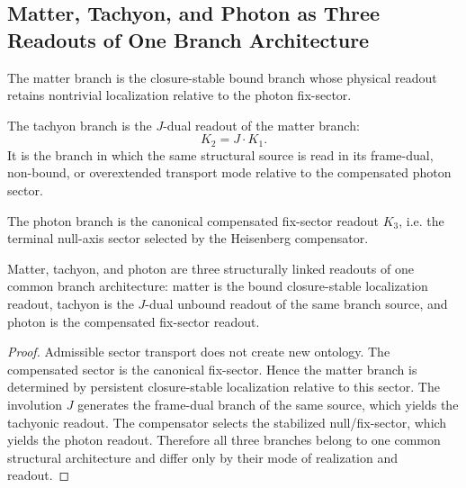 \subsection{Matter, Tachyon, and Photon as Three Readouts of One Branch Architecture}
\label{subsec:mtp-readout}

\begin{definition}
The matter branch is the closure-stable bound branch whose physical readout
retains nontrivial localization relative to the photon fix-sector.
\end{definition}

\begin{definition}
The tachyon branch is the $J$-dual readout of the matter branch:
\[
K_2 = J\!\cdot\!K_1.
\]
It is the branch in which the same structural source is read in its frame-dual,
non-bound, or overextended transport mode relative to the compensated photon
sector.
\end{definition}

\begin{definition}
The photon branch is the canonical compensated fix-sector readout $K_3$, i.e. the terminal null-axis sector selected by the Heisenberg compensator.
\end{definition}

\begin{theorem}
\label{thm:three-readout-principle}
Matter, tachyon, and photon are three structurally linked readouts of one
common branch architecture: matter is the bound closure-stable localization
readout, tachyon is the $J$-dual unbound readout of the same branch source,
and photon is the compensated fix-sector readout.
\end{theorem}

\begin{proof}
Admissible sector transport does not create new ontology. The compensated
sector is the canonical fix-sector. Hence the matter branch is determined by
persistent closure-stable localization relative to this sector. The involution
$J$ generates the frame-dual branch of the same source, which yields the
tachyonic readout. The compensator selects the stabilized null/fix-sector,
which yields the photon readout. Therefore all three branches belong to one
common structural architecture and differ only by their mode of realization and
readout.
\end{proof}

